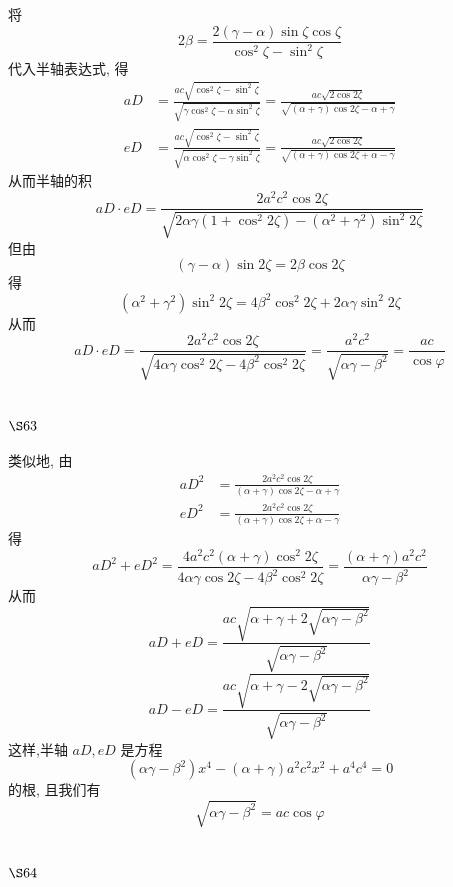 将
\[
2 \beta=\frac{2(\gamma-\alpha) \sin \zeta \cos \zeta}{\cos ^{2} \zeta-\sin ^{2} \zeta}
\]
代入半轴表达式, 得
\[
\begin{aligned}
a D & =\frac{a c \sqrt{\cos ^{2} \zeta-\sin ^{2} \zeta}}{\sqrt{\gamma \cos ^{2} \zeta-\alpha \sin ^{2} \zeta}}=\frac{a c \sqrt{2 \cos 2 \zeta}}{\sqrt{(\alpha+\gamma) \cos 2 \zeta-\alpha+\gamma}} \\
e D & =\frac{a c \sqrt{\cos ^{2} \zeta-\sin ^{2} \zeta}}{\sqrt{\alpha \cos ^{2} \zeta-\gamma \sin ^{2} \zeta}}=\frac{a c \sqrt{2 \cos 2 \zeta}}{\sqrt{(\alpha+\gamma) \cos 2 \zeta+\alpha-\gamma}}
\end{aligned}
\]
从而半轴的积
\[
a D \cdot e D=\frac{2 a^{2} c^{2} \cos 2 \zeta}{\sqrt{2 \alpha \gamma\left(1+\cos ^{2} 2 \zeta\right)-\left(\alpha^{2}+\gamma^{2}\right) \sin ^{2} 2 \zeta}}
\]
但由
\[
(\gamma-\alpha) \sin 2 \zeta=2 \beta \cos 2 \zeta
\]
得
\[
\left(\alpha^{2}+\gamma^{2}\right) \sin ^{2} 2 \zeta=4 \beta^{2} \cos ^{2} 2 \zeta+2 \alpha \gamma \sin ^{2} 2 \zeta
\]
从而
\[
a D \cdot e D=\frac{2 a^{2} c^{2} \cos 2 \zeta}{\sqrt{4 \alpha \gamma \cos ^{2} 2 \zeta-4 \beta^{2} \cos ^{2} 2 \zeta}}=\frac{a^{2} c^{2}}{\sqrt{\alpha \gamma-\beta^{2}}}=\frac{a c}{\cos \varphi}
\]
\section{$\S 63$}

类似地, 由
\[
\begin{aligned}
a D^{2} & =\frac{2 a^{2} c^{2} \cos 2 \zeta}{(\alpha+\gamma) \cos 2 \zeta-\alpha+\gamma} \\
e D^{2} & =\frac{2 a^{2} c^{2} \cos 2 \zeta}{(\alpha+\gamma) \cos 2 \zeta+\alpha-\gamma}
\end{aligned}
\]
得
\[
a D^{2}+e D^{2}=\frac{4 a^{2} c^{2}(\alpha+\gamma) \cos ^{2} 2 \zeta}{4 \alpha \gamma \cos 2 \zeta-4 \beta^{2} \cos ^{2} 2 \zeta}=\frac{(\alpha+\gamma) a^{2} c^{2}}{\alpha \gamma-\beta^{2}}
\]
从而
\[
a D+e D=\frac{a c \sqrt{\alpha+\gamma+2 \sqrt{\alpha \gamma-\beta^{2}}}}{\sqrt{\alpha \gamma-\beta^{2}}}
\]
\[
a D-e D=\frac{a c \sqrt{\alpha+\gamma-2 \sqrt{\alpha \gamma-\beta^{2}}}}{\sqrt{\alpha \gamma-\beta^{2}}}
\]
这样,半轴 $a D, e D$ 是方程
\[
\left(\alpha \gamma-\beta^{2}\right) x^{4}-(\alpha+\gamma) a^{2} c^{2} x^{2}+a^{4} c^{4}=0
\]
的根, 且我们有
\[
\sqrt{\alpha \gamma-\beta^{2}}=a c \cos \varphi 
\]
\section{$\S 64$}

